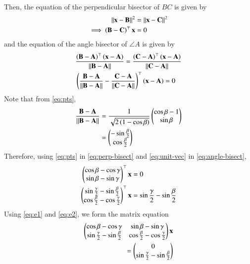 \documentclass[journal,12pt,twocolumn]{IEEEtran}
\renewcommand{\vec}[1]{\boldsymbol{\mathbf{#1}}}
\begin{document}
\begin{enumerate}
    Then, the equation of the perpendicular bisector of $BC$ is given by
    \begin{align}
        \norm{\vec{x}-\vec{B}}^2&=\norm{\vec{x}-\vec{C}}^2 \\
        \implies \brak{\vec{B}-\vec{C}}^\top\vec{x} &= 0
        \label{eq:perp-bisect}
    \end{align}
    and the equation of the angle bisector of $\angle A$ is given by
    \begin{align}
        &\frac{\brak{\vec{B}-\vec{A}}^\top\brak{\vec{x}-\vec{A}}}{\norm{\vec{B}-\vec{A}}} = \frac{\brak{\vec{C}-\vec{A}}^\top\brak{\vec{x}-\vec{A}}}{\norm{\vec{C}-\vec{A}}} \\
        &\brak{\frac{\vec{B}-\vec{A}}{\norm{\vec{B}-\vec{A}}}-\frac{\vec{C}-\vec{A}}{\norm{\vec{C}-\vec{A}}}}^\top\brak{\vec{x}-\vec{A}} = 0
        \label{eq:angle-bisect}
    \end{align}
    Note that from \eqref{eq:pts},
    \begin{align}
        \frac{\vec{B}-\vec{A}}{\norm{\vec{B}-\vec{A}}} &= \frac{1}{\sqrt{2\brak{1-\cos\beta}}}\myvec{\cos\beta-1\\\sin\beta} \\
                                                       &= \myvec{-\sin\frac{\beta}{2}\\\cos\frac{\beta}{2}}
                                                       \label{eq:unit-vec}
    \end{align}
    Therefore, using \eqref{eq:pts} in \eqref{eq:perp-bisect} and
    \eqref{eq:unit-vec} in \eqref{eq:angle-bisect},
    \begin{align}
        \myvec{\cos\beta-\cos\gamma\\\sin\beta-\sin\gamma}^\top\vec{x} &= 0 \label{eq:e1} \\
        \myvec{\sin\frac{\gamma}{2}-\sin\frac{\beta}{2}\\\cos\frac{\beta}{2}-\cos\frac{\gamma}{2}}^\top\vec{x} &= \sin\frac{\gamma}{2}-\sin\frac{\beta}{2} \label{eq:e2}
    \end{align}
    Using \eqref{eq:e1} and \eqref{eq:e2}, we form the matrix equation
    \begin{align}
        \myvec{\cos\beta-\cos\gamma&\sin\beta-\sin\gamma\\\sin\frac{\gamma}{2}-\sin\frac{\beta}{2}&\cos\frac{\beta}{2}-\cos\frac{\gamma}{2}}\vec{x} \nonumber \\
        = \myvec{0\\\sin\frac{\gamma}{2}-\sin\frac{\beta}{2}}

\end{align}
\end{enumerate}
\end{document}
